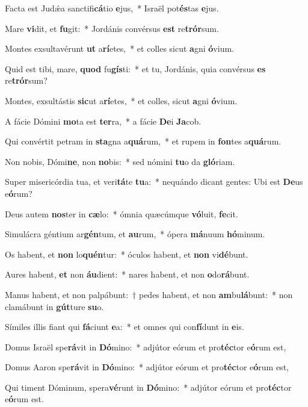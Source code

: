 \item Facta est Judǽa sanctifi\textbf{cá}tio \textbf{e}jus,~* Israël pot\textbf{és}tas \textbf{e}jus.
\item Mare \textbf{vi}dit, et \textbf{fu}git:~* Jordánis convérsus \textbf{est} re\textbf{trór}sum.
\item Montes exsultavérunt \textbf{ut} a\textbf{rí}etes,~* et colles sicut \textbf{a}gni \textbf{ó}vium.
\item Quid est tibi, mare, \textbf{quod} fu\textbf{gís}ti:~* et tu, Jordánis, quia convérsus \textbf{es} re\textbf{trór}sum?
\item Montes, exsultástis \textbf{sic}ut a\textbf{rí}etes,~* et colles, sicut \textbf{a}gni \textbf{ó}vium.
\item A fácie Dómini \textbf{mo}ta est \textbf{ter}ra,~* a fácie \textbf{De}i \textbf{Ja}cob.
\item Qui convértit petram in \textbf{sta}gna a\textbf{quá}rum,~* et rupem in \textbf{fon}tes a\textbf{quá}rum.
\item Non nobis, Dómi\textbf{ne}, non \textbf{no}bis:~* sed nómini \textbf{tu}o da \textbf{gló}riam.
\item Super misericórdia tua, et veri\textbf{tá}te \textbf{tu}a:~* nequándo dicant gentes: Ubi est \textbf{De}us e\textbf{ó}rum?
\item Deus autem \textbf{nos}ter in \textbf{cæ}lo:~* ómnia quæcúmque \textbf{vó}luit, \textbf{fe}cit.
\item Simulácra géntium ar\textbf{gén}tum, et \textbf{au}rum,~* ópera \textbf{má}nuum \textbf{hó}minum.
\item Os habent, et \textbf{non} lo\textbf{quén}tur:~* óculos habent, et \textbf{non} vi\textbf{dé}bunt.
\item Aures habent, \textbf{et} non \textbf{áu}dient:~* nares habent, et non \textbf{o}do\textbf{rá}bunt.
\item Manus habent, et non palpábunt:~† pedes habent, et non \textbf{am}bu\textbf{lá}bunt:~* non clamábunt in \textbf{gút}ture \textbf{su}o.
\item Símiles illis fiant qui \textbf{fá}ciunt \textbf{e}a:~* et omnes qui con\textbf{fí}dunt in \textbf{e}is.
\item Domus Israël spe\textbf{rá}vit in \textbf{Dó}mino:~* adjútor eórum et pro\textbf{téc}tor e\textbf{ó}rum est,
\item Domus Aaron spe\textbf{rá}vit in \textbf{Dó}mino:~* adjútor eórum et pro\textbf{téc}tor e\textbf{ó}rum est,
\item Qui timent Dóminum, spera\textbf{vé}runt in \textbf{Dó}mino:~* adjútor eórum et pro\textbf{téc}tor e\textbf{ó}rum est.

